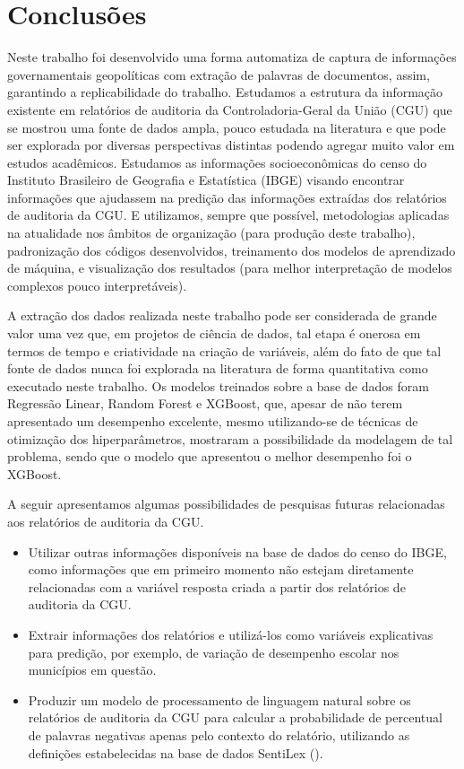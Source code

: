 \chapter{Conclusões}
\label{cap:conclusoes}

Neste trabalho foi desenvolvido uma forma automatiza de captura de informações governamentais geopolíticas com extração de palavras de documentos, assim, garantindo a replicabilidade do trabalho. Estudamos a estrutura da informação existente em relatórios de auditoria da Controladoria-Geral da União (CGU) que se mostrou uma fonte de dados ampla, pouco estudada na literatura e que pode ser explorada por diversas perspectivas distintas podendo agregar muito valor em estudos acadêmicos. Estudamos as informações socioeconômicas do censo do Instituto Brasileiro de Geografia e Estatística (IBGE) visando encontrar informações que ajudassem na predição das informações extraídas dos relatórios de auditoria da CGU. E utilizamos, sempre que possível, metodologias aplicadas na atualidade nos âmbitos de organização (para produção deste trabalho), padronização dos códigos desenvolvidos, treinamento dos modelos de aprendizado de máquina, e visualização dos resultados (para melhor interpretação de modelos complexos pouco interpretáveis).

A extração dos dados realizada neste trabalho pode ser considerada de grande valor uma vez que, em projetos de ciência de dados, tal etapa é onerosa em termos de tempo e criatividade na criação de variáveis, além do fato de que tal fonte de dados nunca foi explorada na literatura de forma quantitativa como executado neste trabalho. Os modelos treinados sobre a base de dados foram Regressão Linear, Random Forest e XGBoost, que, apesar de não terem apresentado um desempenho excelente, mesmo utilizando-se de técnicas de otimização dos hiperparâmetros, mostraram a possibilidade da modelagem de tal problema, sendo que o modelo que apresentou o melhor desempenho foi o XGBoost.

A seguir apresentamos algumas possibilidades de pesquisas futuras relacionadas aos relatórios de auditoria da CGU.

\begin{itemize}
	\item Utilizar outras informações disponíveis na base de dados do censo do IBGE, como informações que em primeiro momento não estejam diretamente relacionadas com a variável resposta criada a partir dos relatórios de auditoria da CGU.
	\item Extrair informações dos relatórios e utilizá-los como variáveis explicativas para predição, por exemplo, de variação de desempenho escolar nos municípios em questão.
	\item Produzir um modelo de processamento de linguagem natural sobre os relatórios de auditoria da CGU para calcular a probabilidade de percentual de palavras negativas apenas pelo contexto do relatório, utilizando as definições estabelecidas na base de dados SentiLex (\citet{Silva2012}).
\end{itemize}

